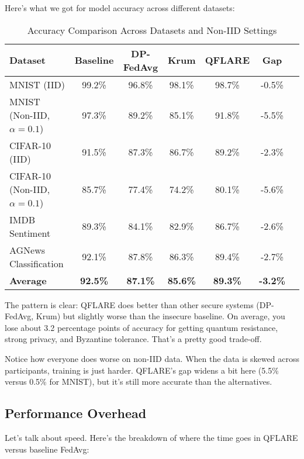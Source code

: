 \documentclass[journal,onecolumn]{IEEEtran}
\begin{document}
Here's what we got for model accuracy across different datasets:

\begin{table}[h]
\centering
\caption{Accuracy Comparison Across Datasets and Non-IID Settings}
\label{tab:accuracy_results}
\begin{tabular}{@{}lcccccc@{}}
\toprule
\textbf{Dataset} & \textbf{Baseline} & \textbf{DP-FedAvg} & \textbf{Krum} & \textbf{QFLARE} & \textbf{Gap} \\
\midrule
MNIST (IID) & 99.2\% & 96.8\% & 98.1\% & 98.7\% & -0.5\% \\
MNIST (Non-IID, $\alpha=0.1$) & 97.3\% & 89.2\% & 85.1\% & 91.8\% & -5.5\% \\
CIFAR-10 (IID) & 91.5\% & 87.3\% & 86.7\% & 89.2\% & -2.3\% \\
CIFAR-10 (Non-IID, $\alpha=0.1$) & 85.7\% & 77.4\% & 74.2\% & 80.1\% & -5.6\% \\
IMDB Sentiment & 89.3\% & 84.1\% & 82.9\% & 86.7\% & -2.6\% \\
AGNews Classification & 92.1\% & 87.8\% & 86.3\% & 89.4\% & -2.7\% \\
\midrule
\textbf{Average} & \textbf{92.5\%} & \textbf{87.1\%} & \textbf{85.6\%} & \textbf{89.3\%} & \textbf{-3.2\%} \\
\bottomrule
\end{tabular}
\end{table}

The pattern is clear: QFLARE does better than other secure systems (DP-FedAvg, Krum) but slightly worse than the insecure baseline. On average, you lose about 3.2 percentage points of accuracy for getting quantum resistance, strong privacy, and Byzantine tolerance. That's a pretty good trade-off.

Notice how everyone does worse on non-IID data. When the data is skewed across participants, training is just harder. QFLARE's gap widens a bit here (5.5\% versus 0.5\% for MNIST), but it's still more accurate than the alternatives.

\subsection{Performance Overhead}

Let's talk about speed. Here's the breakdown of where the time goes in QFLARE versus baseline FedAvg:
\end{document}
